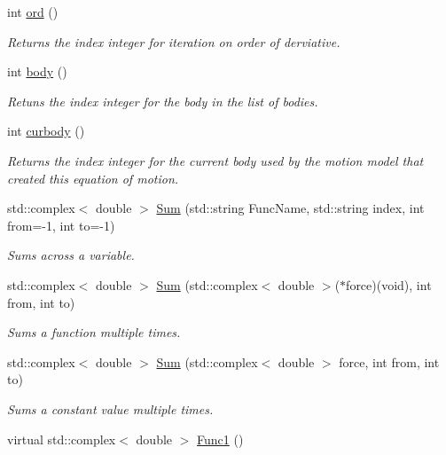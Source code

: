 \begin{DoxyCompactItemize}
int \hyperlink{classosea_1_1ofreq_1_1_equationof_motion_a31f904818ce75c9e2a2b5cff9fc707a5}{ord} ()
\begin{DoxyCompactList}\small\item\em Returns the index integer for iteration on order of derviative. \end{DoxyCompactList}\item 
int \hyperlink{classosea_1_1ofreq_1_1_equationof_motion_ac87fe1d5112f5b42f9afd5f1c3b9002c}{body} ()
\begin{DoxyCompactList}\small\item\em Retuns the index integer for the body in the list of bodies. \end{DoxyCompactList}\item 
int \hyperlink{classosea_1_1ofreq_1_1_equationof_motion_a2fd7f9778dced5bba0d362841cf182a7}{curbody} ()
\begin{DoxyCompactList}\small\item\em Returns the index integer for the current body used by the motion model that created this equation of motion. \end{DoxyCompactList}\item 
std\-::complex$<$ double $>$ \hyperlink{classosea_1_1ofreq_1_1_equationof_motion_a5907d782ee639d5ec24515ed21050851}{Sum} (std\-::string Func\-Name, std\-::string index, int from=-\/1, int to=-\/1)
\begin{DoxyCompactList}\small\item\em Sums across a variable. \end{DoxyCompactList}\item 
std\-::complex$<$ double $>$ \hyperlink{classosea_1_1ofreq_1_1_equationof_motion_ab255de5deaef7394c788bb68a432aec0}{Sum} (std\-::complex$<$ double $>$($\ast$force)(void), int from, int to)
\begin{DoxyCompactList}\small\item\em Sums a function multiple times. \end{DoxyCompactList}\item 
std\-::complex$<$ double $>$ \hyperlink{classosea_1_1ofreq_1_1_equationof_motion_a44797e6d9ebed0de563ac08d15f8035f}{Sum} (std\-::complex$<$ double $>$ force, int from, int to)
\begin{DoxyCompactList}\small\item\em Sums a constant value multiple times. \end{DoxyCompactList}\item 
virtual std\-::complex$<$ double $>$ \hyperlink{classosea_1_1ofreq_1_1_equationof_motion_af83fcd0f9089a49f0b36e1af79b66922}{Func1} ()

\end{DoxyCompactItemize}
